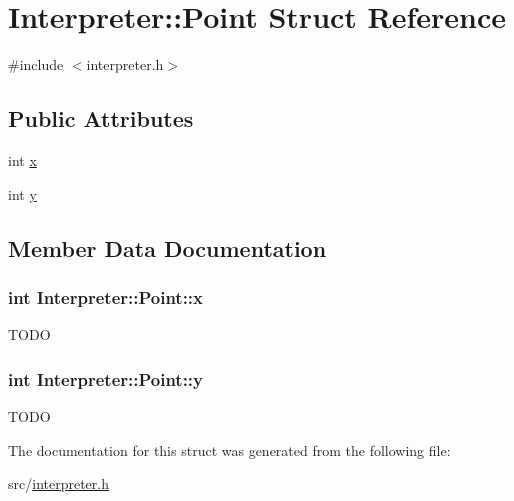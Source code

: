 \hypertarget{structInterpreter_1_1Point}{
\section{Interpreter::Point Struct Reference}
\label{structInterpreter_1_1Point}
}


{\ttfamily \#include $<$interpreter.h$>$}

\subsection*{Public Attributes}
\begin{DoxyCompactItemize}
\item 
int \hyperlink{structInterpreter_1_1Point_adb600c47a8131eae82454d92e81e6956}{x}
\item 
int \hyperlink{structInterpreter_1_1Point_a61e3664bd27fa93316e4cb7ec5758c54}{y}
\end{DoxyCompactItemize}


\subsection{Member Data Documentation}
\hypertarget{structInterpreter_1_1Point_adb600c47a8131eae82454d92e81e6956}{
\subsubsection[{x}]{\setlength{\rightskip}{0pt plus 5cm}int {\bf Interpreter::Point::x}}}
\label{structInterpreter_1_1Point_adb600c47a8131eae82454d92e81e6956}
TODO \hypertarget{structInterpreter_1_1Point_a61e3664bd27fa93316e4cb7ec5758c54}{
\subsubsection[{y}]{\setlength{\rightskip}{0pt plus 5cm}int {\bf Interpreter::Point::y}}}
\label{structInterpreter_1_1Point_a61e3664bd27fa93316e4cb7ec5758c54}
TODO 

The documentation for this struct was generated from the following file:\begin{DoxyCompactItemize}
\item 
src/\hyperlink{interpreter_8h}{interpreter.h}\end{DoxyCompactItemize}
